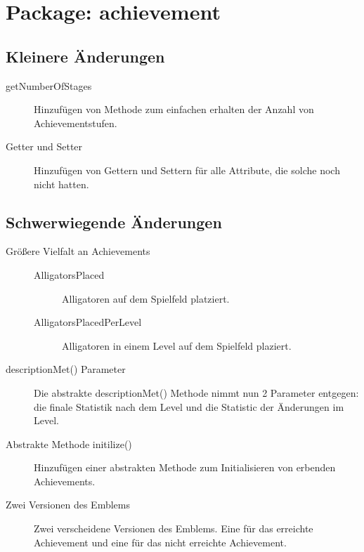 \chapter{Package: achievement}

\section{Kleinere Änderungen}

	\begin{description}
		\item[getNumberOfStages]
		Hinzufügen von Methode zum einfachen erhalten der Anzahl von Achievementstufen.
		\item[Getter und Setter]
		Hinzufügen von Gettern und Settern für alle Attribute, die solche noch nicht hatten.

	\end{description}

\section{Schwerwiegende Änderungen}

	\begin{description}
		\item[Größere Vielfalt an Achievements]
		\begin {description}
			\item[AlligatorsPlaced]
			Alligatoren auf dem Spielfeld platziert.
			\item[AlligatorsPlacedPerLevel]
			Alligatoren in einem Level auf dem Spielfeld plaziert.
		\end {description}
		
		\item[descriptionMet() Parameter]	
		Die abstrakte descriptionMet() Methode nimmt nun 2 Parameter entgegen: die finale Statistik nach dem Level und die Statistic der Änderungen im Level.		

		\item[Abstrakte Methode initilize()]
		Hinzufügen einer abstrakten Methode zum Initialisieren von erbenden Achievements.

		\item[Zwei Versionen des Emblems]
		Zwei verscheidene Versionen des Emblems. Eine für das erreichte Achievement und eine für das nicht erreichte Achievement.

	\end{description}
